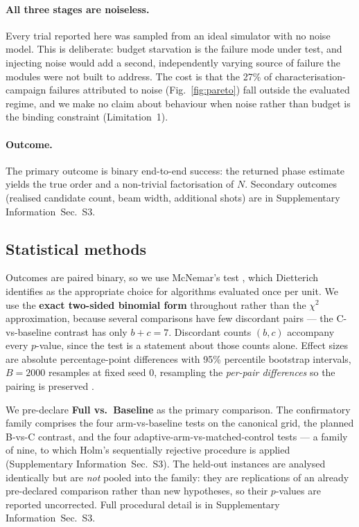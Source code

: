\documentclass[preprint,11pt]{elsarticle}
\newcommand{\SI}{Supplementary Information}
\newcommand{\SItables}{\SI{}~Sec.~S3}
\begin{document}
\paragraph{All three stages are noiseless.} Every trial reported here was
sampled from an ideal simulator with no noise model. This is deliberate:
budget starvation is the failure mode under test, and injecting noise
would add a second, independently varying source of failure the modules
were not built to address. The cost is that the 27\% of
characterisation-campaign failures attributed to noise
(Fig.~\ref{fig:pareto}) fall outside the evaluated regime, and we make no
claim about behaviour when noise rather than budget is the binding
constraint (Limitation~1).

\paragraph{Outcome.} The primary outcome is binary end-to-end success:
the returned phase estimate yields the true order and a non-trivial
factorisation of $N$. Secondary outcomes (realised candidate count, beam
width, additional shots) are in \SItables{}.

\subsection{Statistical methods}
\label{sec:stats}

Outcomes are paired binary, so we use McNemar's test \cite{mcnemar1947},
which Dietterich \cite{dietterich1998} identifies as the appropriate
choice for algorithms evaluated once per unit. We use the \textbf{exact
two-sided binomial form} throughout rather than the $\chi^2$
approximation, because several comparisons have few discordant pairs ---
the C-vs-baseline contrast has only $b+c=7$. Discordant counts $(b,c)$
accompany every $p$-value, since the test is a statement about those
counts alone. Effect sizes are absolute percentage-point differences with
95\% percentile bootstrap intervals, $B=2000$ resamples at fixed seed 0,
resampling the \emph{per-pair differences} so the pairing is preserved
\cite{efron1993}.

We pre-declare \textbf{Full vs.\ Baseline} as the primary comparison. The
confirmatory family comprises the four arm-vs-baseline tests on the
canonical grid, the planned B-vs-C contrast, and the four
adaptive-arm-vs-matched-control tests --- a family of nine, to which
Holm's sequentially rejective procedure \cite{holm1979} is applied
(\SItables{}). The held-out instances are analysed identically
but are \emph{not} pooled into the family: they are replications of an
already pre-declared comparison rather than new hypotheses, so their
$p$-values are reported uncorrected. Full procedural detail is in
\SItables{}.
\end{document}
